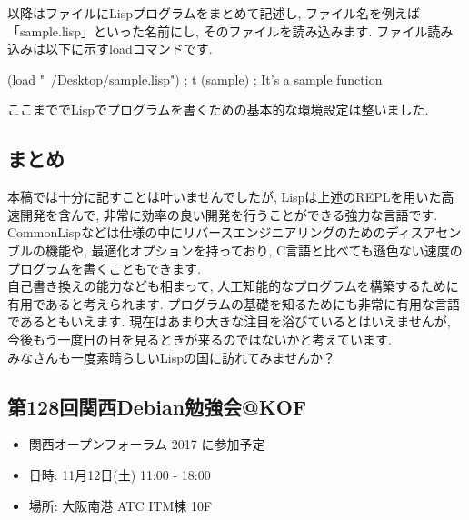 \documentclass[mingoth,a4paper]{jsarticle}
\begin{document}
以降はファイルにLispプログラムをまとめて記述し, ファイル名を例えば「sample.lisp」といった名前にし, そのファイルを読み込みます. ファイル読み込みは以下に示すloadコマンドです. 

\begin{commandline}
(load "~/Desktop/sample.lisp")
; t
(sample)
; It's a sample function
\end{commandline}

ここまででLispでプログラムを書くための基本的な環境設定は整いました. 


\subsection{まとめ}
本稿では十分に記すことは叶いませんでしたが, Lispは上述のREPLを用いた高速開発を含んで, 非常に効率の良い開発を行うことができる強力な言語です. CommonLispなどは仕様の中にリバースエンジニアリングのためのディスアセンブルの機能や, 最適化オプションを持っており, C言語と比べても遜色ない速度のプログラムを書くこともできます. \vspace{1em}\\
自己書き換えの能力なども相まって, 人工知能的なプログラムを構築するために有用であると考えられます. プログラムの基礎を知るためにも非常に有用な言語であるともいえます. 現在はあまり大きな注目を浴びているとはいえませんが, 今後もう一度日の目を見るときが来るのではないかと考えています. \vspace{1em}\\
みなさんも一度素晴らしいLispの国に訪れてみませんか？

\pagebreak

\subsection{第128回関西Debian勉強会@KOF}
\begin{itemize}
\item 関西オープンフォーラム 2017 に参加予定 
\item 日時: 11月12日(土) 11:00 - 18:00
\item 場所: 大阪南港 ATC ITM棟 10F
\end{itemize}



\pagebreak
\end{document}
